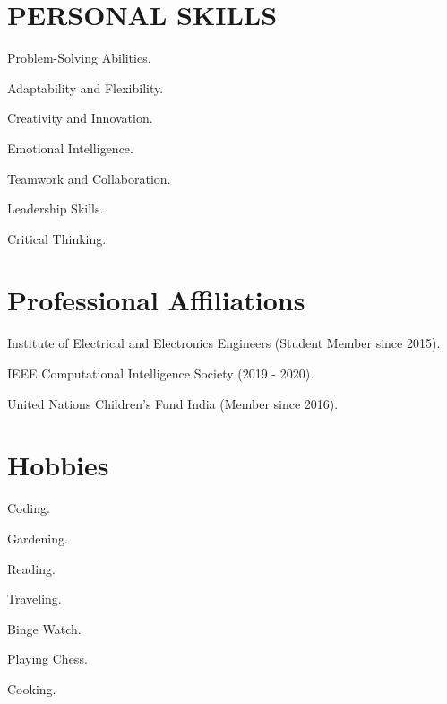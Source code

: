 \documentclass[fontsize=11pt]{tccv}
\begin{document}
\section{PERSONAL SKILLS}
\begin{skills}
\item {Problem-Solving Abilities.}
\item {Adaptability and Flexibility.}
\item {Creativity and Innovation.}
\item {Emotional Intelligence.}
\item {Teamwork and Collaboration.}
\item {Leadership Skills.}
\item {Critical Thinking.}
\end{skills}
\vspace{1em}

\section{Professional Affiliations}
\begin{skills}
\item {Institute of Electrical and Electronics Engineers (Student Member since 2015).}
\item {IEEE Computational Intelligence Society (2019 - 2020).}
\item {United Nations Children's Fund India (Member since 2016).}
\end{skills}
\vspace{1em}

\section{Hobbies}
\begin{skills}
\item {Coding.}
\item {Gardening.}
\item {Reading.}
\item {Traveling.}
\item {Binge Watch.} 
\item {Playing Chess.}
\item {Cooking.}
\end{skills}
\vspace{1em}
\end{document}
